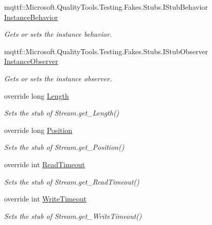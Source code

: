 \begin{DoxyCompactItemize}
mqttf\-::\-Microsoft.\-Quality\-Tools.\-Testing.\-Fakes.\-Stubs.\-I\-Stub\-Behavior \hyperlink{class_system_1_1_i_o_1_1_fakes_1_1_stub_stream_a27ecb806e7bcb4f08cac1bca568b1d37}{Instance\-Behavior}
\begin{DoxyCompactList}\small\item\em Gets or sets the instance behavior.\end{DoxyCompactList}\item 
mqttf\-::\-Microsoft.\-Quality\-Tools.\-Testing.\-Fakes.\-Stubs.\-I\-Stub\-Observer \hyperlink{class_system_1_1_i_o_1_1_fakes_1_1_stub_stream_a43a02650d9f929f517f09b272d4e0627}{Instance\-Observer}
\begin{DoxyCompactList}\small\item\em Gets or sets the instance observer.\end{DoxyCompactList}\item 
override long \hyperlink{class_system_1_1_i_o_1_1_fakes_1_1_stub_stream_ab994c18c810be9fd59b11604294fbfa8}{Length}
\begin{DoxyCompactList}\small\item\em Sets the stub of Stream.\-get\-\_\-\-Length()\end{DoxyCompactList}\item 
override long \hyperlink{class_system_1_1_i_o_1_1_fakes_1_1_stub_stream_a5b68fff2e0b26047d9e8e87a424a6da7}{Position}
\begin{DoxyCompactList}\small\item\em Sets the stub of Stream.\-get\-\_\-\-Position()\end{DoxyCompactList}\item 
override int \hyperlink{class_system_1_1_i_o_1_1_fakes_1_1_stub_stream_ac2ad0a8f43f9e86ae213834d5a7c5a16}{Read\-Timeout}
\begin{DoxyCompactList}\small\item\em Sets the stub of Stream.\-get\-\_\-\-Read\-Timeout()\end{DoxyCompactList}\item 
override int \hyperlink{class_system_1_1_i_o_1_1_fakes_1_1_stub_stream_a323e383a9449ab5bcb90b91b5066055f}{Write\-Timeout}
\begin{DoxyCompactList}\small\item\em Sets the stub of Stream.\-get\-\_\-\-Write\-Timeout()\end{DoxyCompactList}\end{DoxyCompactItemize}


